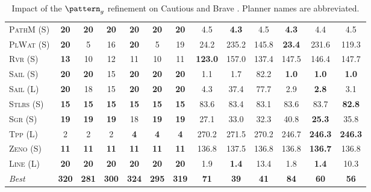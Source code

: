 \documentclass[11pt,landscape]{article}
\begin{document}
\begin{table}[tb]
{\begin{tabular}{|l||cccccc||cccccc||}
\textsc{PathM} (S)&\textbf{20}&\textbf{20}&\textbf{20}&\textbf{20}&\textbf{20}&\textbf{20}&4.5&\textbf{4.3}&4.5&\textbf{4.3}&4.4&4.5\\
\textsc{PlWat} (S)&\textbf{20}&5&16&\textbf{20}&5&19&24.2&235.2&145.8&\textbf{23.4}&231.6&119.3\\
\textsc{Rvr} (S)&\textbf{13}&10&12&11&10&11&\textbf{123.0}&157.0&137.4&147.5&146.4&147.7\\
\textsc{Sail} (S)&\textbf{20}&\textbf{20}&15&\textbf{20}&\textbf{20}&\textbf{20}&1.1&1.7&82.2&\textbf{1.0}&\textbf{1.0}&\textbf{1.0}\\
\textsc{Sail} (L)&\textbf{20}&18&15&\textbf{20}&\textbf{20}&\textbf{20}&4.3&37.4&77.7&2.9&\textbf{2.8}&3.1\\
\textsc{Stlrs} (S)&\textbf{15}&\textbf{15}&\textbf{15}&\textbf{15}&\textbf{15}&\textbf{15}&83.6&83.4&83.1&83.6&83.7&\textbf{82.8}\\
\textsc{Sgr} (S)&\textbf{19}&\textbf{19}&\textbf{19}&18&\textbf{19}&\textbf{19}&27.1&33.0&32.3&40.8&\textbf{25.3}&35.8\\
\textsc{Tpp} (L)&2&2&2&\textbf{4}&\textbf{4}&\textbf{4}&270.2&271.5&270.2&246.7&\textbf{246.3}&\textbf{246.3}\\
\textsc{Zeno} (S)&\textbf{11}&\textbf{11}&\textbf{11}&\textbf{11}&\textbf{11}&\textbf{11}&136.8&137.5&136.8&136.8&\textbf{136.7}&136.8\\
\textsc{Line} (L)&\textbf{20}&\textbf{20}&\textbf{20}&\textbf{20}&\textbf{20}&\textbf{20}&1.9&\textbf{1.4}&13.4&1.8&\textbf{1.4}&10.3
\\\hline
\textit{Best}&\textbf{320}&\textbf{281}&\textbf{300}&\textbf{324}&\textbf{295}&\textbf{319}&\textbf{71}&\textbf{39}&\textbf{41}&\textbf{84}&\textbf{60}&\textbf{56}\\\hline

        \end{tabular}}
        \caption{Impact of the $\pattern_g$ refinement on Cautious and Brave \pattyd. Planner names are abbreviated.}
        \label{tab:abl-patterng}
        \end{table}
        
\end{document}
